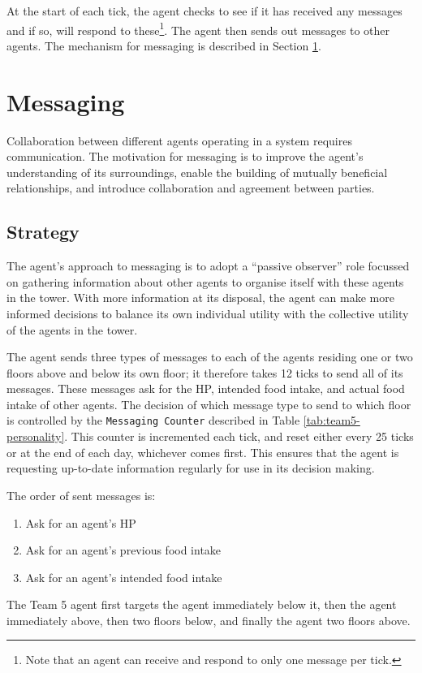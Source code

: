 At the start of each tick, the agent checks to see if it has received any messages and if so, will respond to these\footnote{Note that an agent can receive and respond to only one message per tick.}. The agent then sends out messages to other agents. The mechanism for messaging is described in Section \ref{sec:team5-messaging}.

\section{Messaging}\label{sec:team5-messaging}
Collaboration between different agents operating in a system requires communication. The motivation for messaging is to improve the agent's understanding of its surroundings, enable the building of mutually beneficial relationships, and introduce collaboration and agreement between parties.

\subsection*{Strategy}\label{sec:team5-messaging-strategy}
The agent's approach to messaging is to adopt a ``passive observer'' role focussed on gathering information about other agents to organise itself with these agents in the tower. With more information at its disposal, the agent can make more informed decisions to balance its own individual utility with the collective utility of the agents in the tower.

The agent sends three types of messages to each of the agents residing one or two floors above and below its own floor; it therefore takes 12 ticks to send all of its messages. These messages ask for the HP, intended food intake, and actual food intake of other agents. The decision of which message type to send to which floor is controlled by the \texttt{Messaging Counter} described in Table \ref{tab:team5-personality}. This counter is incremented each tick, and reset either every 25 ticks or at the end of each day, whichever comes first. This ensures that the agent is requesting up-to-date information regularly for use in its decision making.

The order of sent messages is:
\begin{enumerate}
    \item Ask for an agent's HP
    \item Ask for an agent's previous food intake
    \item Ask for an agent's intended food intake
\end{enumerate}
The Team 5 agent first targets the agent immediately below it, then the agent immediately above, then two floors below, and finally the agent two floors above.

